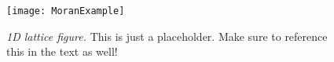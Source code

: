 \begin{figure}[h]
	\centering
	\texttt{[image: MoranExample]}
	\caption{\emph{1D lattice figure.} This is just a placeholder. Make sure to reference this in the text as well!} \label{latticefig}
\end{figure}


